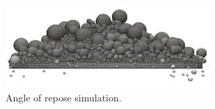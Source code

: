 \begin{figure}[!htb]
\centering
\includegraphics[width=.50\columnwidth]{images/065aorsim}
\caption[AoR sim]{Angle of repose simulation.}
\label{fig:065aorsim}
\end{figure}